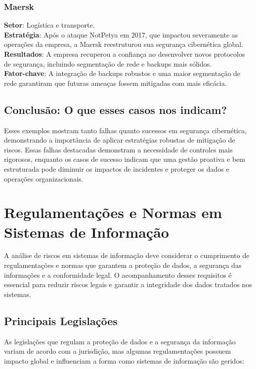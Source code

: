 \documentclass[12pt,oneside,a4paper,article]{abntex2}
\begin{document}
\subsubsection{Maersk}
\textbf{Setor}: Logística e transporte. \\
\textbf{Estratégia}: Após o ataque NotPetya em 2017, que impactou severamente as operações da empresa, a Maersk reestruturou sua segurança cibernética global. \\
\textbf{Resultados}: A empresa recuperou a confiança ao desenvolver novos protocolos de segurança, incluindo segmentação de rede e backups mais sólidos. \\
\textbf{Fator-chave}: A integração de backups robustos e uma maior segmentação de rede garantiram que futuras ameaças fossem mitigadas com mais eficácia.


\subsection{Conclusão: O que esses casos nos indicam?}
Esses exemplos mostram tanto falhas quanto sucessos em segurança cibernética, demonstrando a importância de aplicar estratégias robustas de mitigação de riscos. Essas falhas destacadas demonstram a necessidade de controles mais rigorosos, enquanto os casos de sucesso indicam que uma gestão proativa e bem estruturada pode diminuir os impactos de incidentes e proteger os dados e operações organizacionais.




\section{\textbf{Regulamentações e Normas em Sistemas de Informação}}

A análise de riscos em sistemas de informação deve considerar o cumprimento de regulamentações e normas que garantem a proteção de dados, a segurança das informações e a conformidade legal. O acompanhamento desses requisitos é essencial para reduzir riscos legais e garantir a integridade dos dados tratados nos sistemas.

\subsection{Principais Legislações}

As legislações que regulam a proteção de dados e a segurança da informação variam de acordo com a jurisdição, mas algumas regulamentações possuem impacto global e influenciam a forma como sistemas de informação são geridos:
\end{document}
